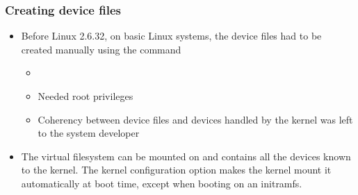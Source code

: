 \begin{frame}
  \frametitle{Creating device files}
  \begin{itemize}
    \item Before Linux 2.6.32, on basic Linux systems,
    the device files had to be created manually using the
     command
    \begin{itemize}
    \item {}
    \item Needed root privileges
    \item Coherency between device files and devices handled by the
      kernel was left to the system developer
    \end{itemize}
  \item The  virtual filesystem can be mounted on
     and contains all the devices known to the kernel.
    The  kernel configuration option
    makes the kernel mount it automatically at boot time, except
    when booting on an initramfs.
  \end{itemize}
\end{frame}
